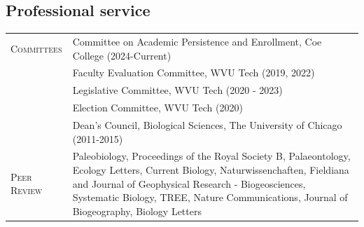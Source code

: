 \documentclass[a4paper, oneside, final]{scrartcl} %
\newcommand{\gray}{\rowcolor[gray]{.90}} %
\begin{document}
\begin{center}



\section{Professional service}

\begin{tabularx}{0.97\linewidth}{>{\raggedleft\scshape}p{2cm}X}

Committees & Committee on Academic Persistence and Enrollment, Coe College (2024-Current) \\ 
& Faculty Evaluation Committee, WVU Tech (2019, 2022) \\
& Legislative Committee, WVU Tech (2020 - 2023) \\
& Election Committee, WVU Tech (2020) \\
& Dean's Council, Biological Sciences, The University of Chicago (2011-2015) \\

\gray Peer Review & Paleobiology, Proceedings of the Royal Society B, Palaeontology, Ecology Letters, Current Biology, Naturwissenchaften, Fieldiana and Journal of Geophysical Research - Biogeosciences, Systematic Biology, TREE, Nature Communications, Journal of Biogeography,  Biology Letters\\





\end{tabularx}
\end{center}
\end{document}
